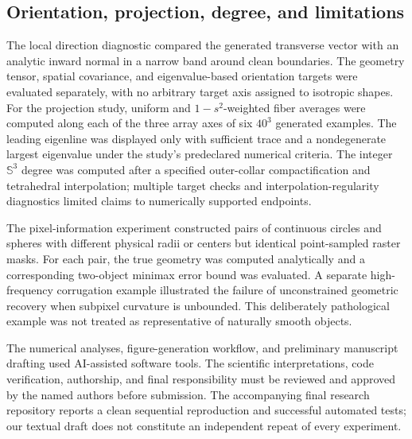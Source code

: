 \documentclass[11pt,a4paper]{article}
\newcommand{\Sn}{\mathbb S}
\begin{document}
\subsection{Orientation, projection, degree, and limitations}
The local direction diagnostic compared the generated transverse vector with an analytic inward normal in a narrow band around clean boundaries. The geometry tensor, spatial covariance, and eigenvalue-based orientation targets were evaluated separately, with no arbitrary target axis assigned to isotropic shapes. For the projection study, uniform and \(1-s^2\)-weighted fiber averages were computed along each of the three array axes of six \(40^3\) generated examples. The leading eigenline was displayed only with sufficient trace and a nondegenerate largest eigenvalue under the study's predeclared numerical criteria. The integer \(\Sn^3\) degree was computed after a specified outer-collar compactification and tetrahedral interpolation; multiple target checks and interpolation-regularity diagnostics limited claims to numerically supported endpoints.

The pixel-information experiment constructed pairs of continuous circles and spheres with different physical radii or centers but identical point-sampled raster masks. For each pair, the true geometry was computed analytically and a corresponding two-object minimax error bound was evaluated. A separate high-frequency corrugation example illustrated the failure of unconstrained geometric recovery when subpixel curvature is unbounded. This deliberately pathological example was not treated as representative of naturally smooth objects.

The numerical analyses, figure-generation workflow, and preliminary manuscript drafting used AI-assisted software tools. The scientific interpretations, code verification, authorship, and final responsibility must be reviewed and approved by the named authors before submission. The accompanying final research repository reports a clean sequential reproduction and successful automated tests; our textual draft does not constitute an independent repeat of every experiment.
\end{document}
